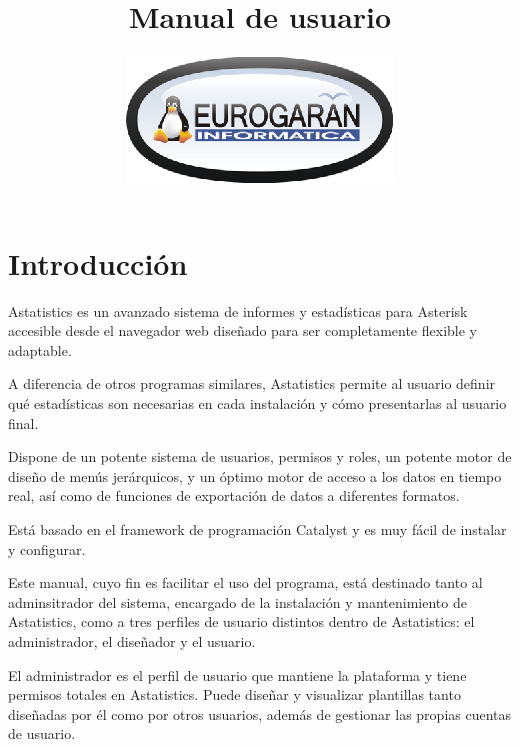 \documentclass[spanish,12pt]{book}
\begin{document}
\title{Manual de usuario}
\author{\includegraphics{artwork/logo-mini-oval-peq.ps}}
\maketitle
%
\cleardoublepage

 \tableofcontents \cleardoublepage \newpage {}

\chapter{Introducción}
Astatistics es un avanzado sistema de informes y estadísticas para Asterisk accesible desde el navegador web diseñado para ser completamente flexible y adaptable.

A diferencia de otros programas similares, Astatistics permite al usuario definir qué estadísticas son necesarias en cada instalación y cómo presentarlas al usuario final.

Dispone de un potente sistema de usuarios, permisos y roles, un potente motor de diseño de menús jerárquicos, y un óptimo motor de acceso a los datos en tiempo real, así como de funciones de exportación de datos a diferentes formatos.

Está basado en el framework de programación Catalyst y es muy fácil de instalar y configurar.

Este manual, cuyo fin es facilitar el uso del programa, está destinado tanto al adminsitrador del sistema, encargado de la instalación y mantenimiento de Astatistics, como a tres perfiles de usuario distintos dentro de Astatistics: el administrador, el diseñador y el usuario.

El administrador es el perfil de usuario que mantiene la plataforma y tiene permisos totales en Astatistics. Puede diseñar y visualizar plantillas tanto diseñadas por él como por otros usuarios, además de gestionar las propias cuentas de usuario.
\end{document}
